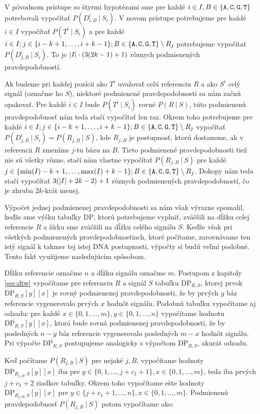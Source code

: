 V pôvodnom prístupe so štyrmi hypotézami sme pre každé $i \in I, B \in \bazy$ potrebovali vypočítať 
$P(D_{i,B}^i ~|~ S_i)$. V novom prístupe potrebujeme pre každé $i \in I$ vypočítať
$P(T^i ~|~ S_i)$ a pre každé $i \in I; j \in \{i-k+1, \dots, i+k-1\}; B \in \bazy \setminus R_j$ 
potrebujeme vypočítať $P(D_{j, B}^i ~|~ S_i)$. To je $\abs*{I} \cdot (3(2k-1)+1)$ rôznych podmienených
pravdepodobností.

Ak budeme pri každej pozícii ako $T^i$ uvažovať celú referenciu $R$ a ako $S^i$ celý signál (označme
ho $S$), niektoré podmienené pravdepodobnosti sa nám začnú opakovať. Pre každé $i \in I$ bude $P(T^i ~|~ S_i)$
rovné $P(R ~|~ S)$, túto podmienenú pravdepodobnosť nám teda stačí vypočítať len raz. Okrem toho
potrebujeme pre každé $i \in I; j \in \{i-k+1, \dots, i+k-1\}; B \in \bazy \setminus R_j$ vypočítať
$P(D_{j, B}^i ~|~ S_i) = P(R_{j, B} ~|~ S)$, kde $R_{j, B}$ je postupnosť, ktorú dostaneme, ak v
referencii $R$ zmeníme $j$-tu bázu na $B$. Tieto podmienené pravdepodobnosti tiež nie sú všetky rôzne,
stačí nám vlastne vypočítať $P(R_{j, B} ~|~ S)$ pre každé $j \in \{\min(I)-k+1, \dots, \max(I)+k-1\}; B 
\in \bazy \setminus R_j$. Dokopy nám teda stačí vypočítať $3(\abs*{I} + 2k -2) + 1$ rôznych podmienených 
pravdepodobností, čo je zhruba $2k$-krát menej.


Výpočet jednej podmienenej pravdepodobnosti sa nám však výrazne spomalil, keďže sme výšku tabuľky $\mathrm{DP}$, ktorú 
potrebujeme vyplniť, zväčšili na dĺžku celej referencie $R$ a šírku sme zväčšili na dĺžku celého signálu 
$S$. Keďže však pri všetkých podmienených pravdepodobnostiach, ktoré počítame, zarovnávame ten istý
signál k takmer tej istej DNA postupnosti, výpočty si budú veľmi podobné. Tento fakt využijeme nasledujúcim spôsobom.

Dĺžku referencie označme $n$ a dĺžku signálu označme $m$. Postupom z kapitoly \ref{sec:dtw} vypočítame
pre referenciu $R$ a signál $S$
tabuľku $\mathrm{DP}_{R,S}$, ktorej prvok $\mathrm{DP}_{R,S}[y][x]$ je rovný podmienenej pravdepodobnosti,
že by prvých $y$ báz referencie vygenerovalo prvých $x$ hodnôt signálu. Podobnú tabuľku vypočítame aj
odzadu: pre každé $x \in \{0, 1, \dots, m\}, y \in \{0, 1, \dots, n\}$ vypočítame hodnotu $\overline{\mathrm{DP}_{R,S}}[y][x]$,
ktorá bude rovná podmienenej pravdepodobnosti, že by posledných $n-y$ báz referencie vygenerovalo
posledných $m-x$ hodnôt signálu. Pri výpočte $\overline{\mathrm{DP}_{R,S}}$ postupujeme analogicky s 
výpočtom $\mathrm{DP}_{R,S}$, akurát odzadu.

Keď počítame $P(R_{j, B} ~|~ S)$ pre nejaké $j, B$, vypočítame hodnoty $\mathrm{DP}_{R_{j,B},S}[y][x]$ 
iba pre $y \in \{0, 1, \dots, j+c_1+1\}, x \in \{0, 1, \dots, m\}$, teda iba prvých $j+c_1+2$ riadkov 
tabuľky. Okrem toho vypočítame ešte hodnoty $\overline{\mathrm{DP}_{R_{j,B},S}}[y][x]$ pre $y \in \{j
+c_1+1, \dots, n\}, x \in \{0, 1, \dots, m\}$. Podmienenú pravdepodobnosť $P(R_{j, B} ~|~ S)$ potom 
vypočítame ako:

